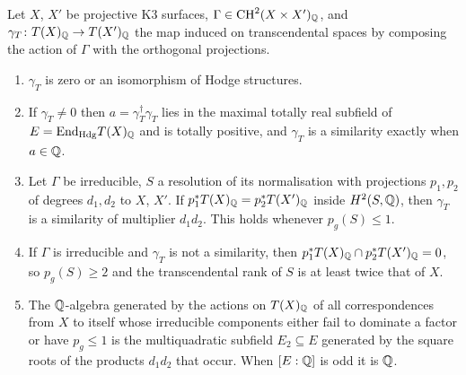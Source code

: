 \begin{proposition}\label{prop:structure}
Let $X$, $X'$ be projective K3 surfaces, $\Gamma\in\mathrm{CH}^{2}(X\times X')_{\mathbb{Q}}$, and $\gamma_{T}\colon T(X)_{\mathbb{Q}}\to T(X')_{\mathbb{Q}}$ the map induced on transcendental spaces by composing the action of $\Gamma$ with the orthogonal projections.
\begin{enumerate}[label=\textup{(\roman*)},leftmargin=2.4em,itemsep=2pt]
\item $\gamma_{T}$ is zero or an isomorphism of Hodge structures.
\item If $\gamma_{T}\ne0$ then $a=\gamma_{T}^{\dagger}\gamma_{T}$ lies in the maximal totally real subfield of $E=\mathrm{End}_{\mathrm{Hdg}}T(X)_{\mathbb{Q}}$ and is totally positive, and $\gamma_{T}$ is a similarity exactly when $a\in\mathbb{Q}$.
\item Let $\Gamma$ be irreducible, $S$ a resolution of its normalisation with projections $p_{1},p_{2}$ of degrees $d_{1},d_{2}$ to $X$, $X'$. If $p_{1}^{*}T(X)_{\mathbb{Q}}=p_{2}^{*}T(X')_{\mathbb{Q}}$ inside $H^{2}(S,\mathbb{Q})$, then $\gamma_{T}$ is a similarity of multiplier $d_{1}d_{2}$. This holds whenever $p_{g}(S)\le1$.
\item If $\Gamma$ is irreducible and $\gamma_{T}$ is not a similarity, then $p_{1}^{*}T(X)_{\mathbb{Q}}\cap p_{2}^{*}T(X')_{\mathbb{Q}}=0$, so $p_{g}(S)\ge2$ and the transcendental rank of $S$ is at least twice that of $X$.
\item The $\mathbb{Q}$-algebra generated by the actions on $T(X)_{\mathbb{Q}}$ of all correspondences from $X$ to itself whose irreducible components either fail to dominate a factor or have $p_{g}\le1$ is the multiquadratic subfield $E_{2}\subseteq E$ generated by the square roots of the products $d_{1}d_{2}$ that occur. When $[E:\mathbb{Q}]$ is odd it is $\mathbb{Q}$.
\end{enumerate}
\end{proposition}

